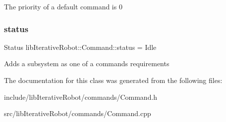 The priority of a default command is 0 \mbox{\label{classlib_iterative_robot_1_1_command_a54548a957a6b4097837c41fcc660467e}} 
\subsubsection{\texorpdfstring{status}{status}}
{\footnotesize\ttfamily Status lib\+Iterative\+Robot\+::\+Command\+::status = Idle\hspace{0.3cm}{\ttfamily [protected]}}

Adds a subsystem as one of a command\textquotesingle{}s requirements 

The documentation for this class was generated from the following files\+:\begin{DoxyCompactItemize}
\item 
include/lib\+Iterative\+Robot/commands/Command.\+h\item 
src/lib\+Iterative\+Robot/commands/Command.\+cpp\end{DoxyCompactItemize}
